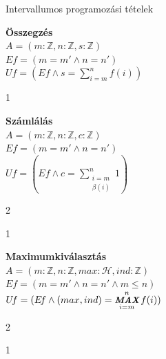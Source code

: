 \documentclass[a4paper,12pt]{article}
\newcommand{\lv}{{:}}
\DeclareMathOperator*{\MAX}{\textit{\small \textbf{MAX}}}
\begin{document}
	\author{Zsolt Borsi}	
	\bigskip
	\bigskip

\begin{center}
{\Large Intervallumos programozási tételek}
\end{center}
\bigskip

\textbf{Összegzés}\\
\medskip
$A = (m\lv\mathbb{Z}, n\lv\mathbb{Z}, s\lv\mathbb{Z})$\\[2pt]
$Ef = (m = m' \land n = n')$\\[2pt]
$Uf = (Ef \land s = \sum\limits_{i=m}^{n}f(i))$

\medskip
\begin{stuki}
  \begin{WHILE}{1}{}
  \end{WHILE}
\end{stuki}
\bigskip

\textbf{Számlálás}\\
\medskip
$A = (m\lv\mathbb{Z}, n\lv\mathbb{Z}, c\lv\mathbb{Z})$\\[2pt]
$E\!f = ( m=m' \land n=n' )$\\[6pt]
$U\!f = ( E\!f \land c = \sum\limits_{\substack{i=m\\[2pt]  \beta(i)}}^{n} 1)$

\medskip
\begin{stuki}
  \begin{WHILE}{2}{}
    \begin{IF}{1}{}
      \ELSE
    \end{IF}
  \end{WHILE}
\end{stuki}

\bigskip

\textbf{Maximumkiválasztás}\\
\medskip
$A = (m\lv\mathbb{Z}, n\lv\mathbb{Z}, max\lv\mathcal{H}, ind\lv\mathbb{Z})$\\[2pt]
$E\!f = ( m=m' \land n=n' \land m \le n )$\\[6pt]
$U\!f = (E\!f \land (max,ind) = \MAX\limits_{i=m}^{n} f(i))$

\begin{stuki}
  \begin{WHILE}{2}{}
    \begin{IF}{1}{}
      \ELSE
    \end{IF}
  \end{WHILE}
\end{stuki}
\end{document}
